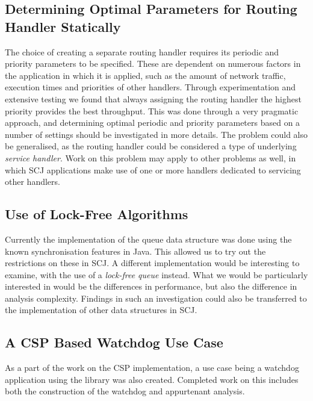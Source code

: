 \subsection{Determining Optimal Parameters for Routing Handler Statically} %
\label{sub:determining_optimal_parameters_for_routing_handler_statically}
The choice of creating a separate routing handler requires its periodic and priority parameters to be specified. These are dependent on numerous factors in the application in which it is applied, such as the amount of network traffic, execution times and priorities of other handlers. Through experimentation and extensive testing we found that always assigning the routing handler the highest priority provides the best throughput. This was done through a very pragmatic approach, and determining optimal periodic and priority parameters based on a number of settings should be investigated in more details. The problem could also be generalised, as the routing handler could be considered a type of underlying \textit{service handler}. Work on this problem may apply to other problems as well, in which SCJ applications make use of one or more handlers dedicated to servicing other handlers.

\subsection{Use of Lock-Free Algorithms} %
\label{sub:lock_free_algorithms}
Currently the implementation of the queue data structure was done using the known synchronisation features in Java. This allowed us to try out the restrictions on these in SCJ. A different implementation would be interesting to examine, with the use of a \textit{lock-free queue} instead\cite{Valois94implementinglock-free, Michael:1996:SFP:248052.248106}. What we would be particularly interested in would be the differences in performance, but also the difference in analysis complexity. Findings in such an investigation could also be transferred to the implementation of other data structures in SCJ.

\subsection{A CSP Based Watchdog Use Case} %
\label{sub:csp_based_watchdog}
As a part of the work on the CSP implementation, a use case being a watchdog application using the library was also created. Completed work on this includes both the construction of the watchdog and appurtenant analysis.

